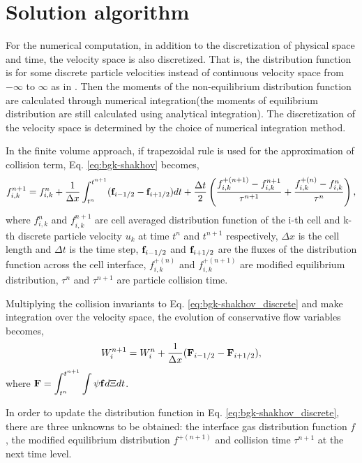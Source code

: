 \documentclass[a4paper]{book}
\begin{document}
\section{Solution algorithm}
For the numerical computation, in addition to the discretization of physical space and time, the velocity space is also discretized. That is, the distribution function is for some discrete particle velocities instead of continuous velocity space from $-\infty$ to $\infty$ as in \cite{Xu2001}. Then the moments of the non-equilibrium distribution function are calculated through numerical integration(the moments of equilibrium distribution are still calculated using analytical integration). The discretization of the velocity space is determined by the choice of numerical integration method.

In the finite volume approach, if trapezoidal rule is used for the approximation of collision term, Eq. \ref{eq:bgk-shakhov} becomes,
\begin{equation} 
    \label{eq:bgk-shakhov_discrete}
    f_{i,k}^{n+1} = f_{i,k}^n+\frac{1}{\Delta x}\int_{t^n}^{t^{n+1}}({\bf f}_{i-1/2}-{\bf f}_{i+1/2})dt+\frac{\Delta t}{2}\left(\frac{f_{i,k}^{+(n+1)}-f_{i,k}^{n+1}}{\tau^{n+1}}+\frac{f_{i,k}^{+(n)}-f_{i,k}^n}{\tau^n}\right),
\end{equation}
where $f_{i,k}^n$ and $f_{i,k}^{n+1}$ are cell averaged distribution function of the i-th cell and k-th discrete particle velocity $u_k$ at time $t^n$ and $t^{n+1}$ respectively, $\Delta x$ is the cell length and $\Delta t$ is the time step, ${\bf f}_{i-1/2}$ and ${\bf f}_{i+1/2}$ are the fluxes of the distribution function across the cell interface, $f_{i,k}^{+(n)}$ and $f_{i,k}^{+(n+1)}$ are modified equilibrium distribution, $\tau^n$ and $\tau^{n+1}$ are particle collision time.

Multiplying the collision invariants to Eq. \ref{eq:bgk-shakhov_discrete} and make integration over the velocity space, the evolution of conservative flow variables becomes,
\begin{equation} 
    \label{eq:conservative_discrete}
    W_i^{n+1} = W_i^n+\frac{1}{\Delta x}({\bf F}_{i-1/2}-{\bf F}_{i+1/2}),
\end{equation}
where $\displaystyle{\bf F} = \int_{t^n}^{t^{n+1}}\int\psi{\bf f}d\Xi dt$.

In order to update the distribution function in Eq. \ref{eq:bgk-shakhov_discrete}, there are three unknowns to be obtained: the interface gas distribution function $f$, the modified equilibrium distribution $f^{+(n+1)}$ and collision time $\tau^{n+1}$ at the next time level.
\end{document}
